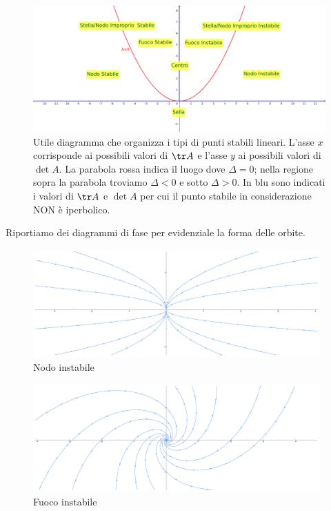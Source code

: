 \begin{figure}[!htb]
    \centering
    \includegraphics[width=\textwidth]{Immagini/Diagramma_punti_stabili_lineari.png}
    \caption{Utile diagramma che organizza i tipi di punti stabili lineari. L'asse $x$ corrisponde ai possibili valori di $\tr A$ e l'asse $y$ ai possibili valori di $\det A$. La parabola rossa indica il luogo dove $\Delta=0$; nella regione sopra la parabola troviamo $\Delta<0$ e sotto $\Delta>0$. In blu sono indicati i valori di $\tr A$ e $\det A$ per cui il punto stabile in considerazione NON \`e iperbolico.}
\end{figure}

\noindent Riportiamo dei diagrammi di fase per evidenziale la forma delle orbite.

\begin{figure}[!htb]
    \centering
    \includegraphics[width=11cm]{Immagini/nodo_instabile.pdf}
    \caption{Nodo instabile}
\end{figure}


\begin{figure}[!htb]
    \centering
    \includegraphics[width=11cm]{Immagini/fuoco_instabile.pdf}
    \caption{Fuoco instabile}
\end{figure}


